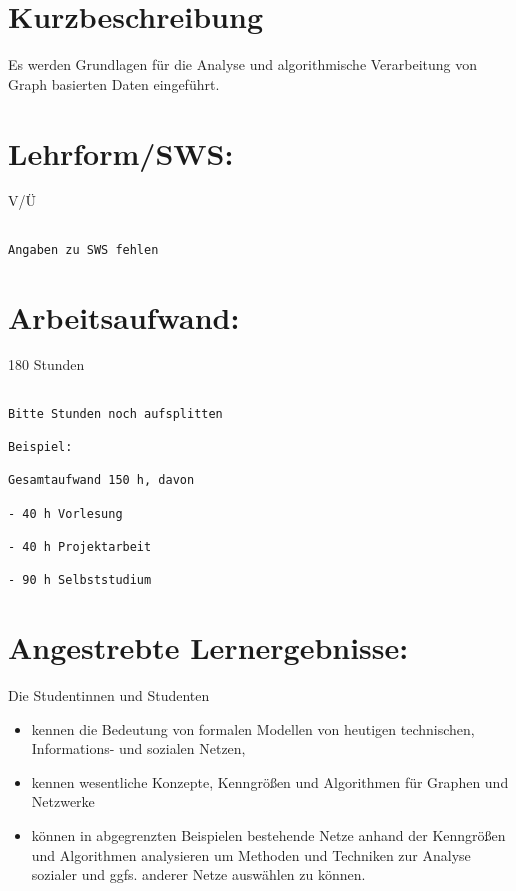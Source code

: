 \section*{Kurzbeschreibung}\label{kurzbeschreibung-5}

Es werden Grundlagen für die Analyse und algorithmische Verarbeitung von
Graph basierten Daten eingeführt.

\section*{Lehrform/SWS:}\label{lehrformsws-11}

V/Ü

\begin{verbatim}

Angaben zu SWS fehlen
\end{verbatim}

\section*{Arbeitsaufwand:}\label{arbeitsaufwand-17}

180 Stunden

\begin{verbatim}

Bitte Stunden noch aufsplitten

Beispiel:

Gesamtaufwand 150 h, davon 

- 40 h Vorlesung 

- 40 h Projektarbeit  

- 90 h Selbststudium 
\end{verbatim}

\section*{Angestrebte
Lernergebnisse:}\label{angestrebte-lernergebnisse-11}

Die Studentinnen und Studenten

\begin{itemize}
\tightlist
\item
  kennen die Bedeutung von formalen Modellen von heutigen technischen,
  Informations- und sozialen Netzen,
\item
  kennen wesentliche Konzepte, Kenngrößen und Algorithmen für Graphen
  und Netzwerke
\item
  können in abgegrenzten Beispielen bestehende Netze anhand der
  Kenngrößen und Algorithmen analysieren um Methoden und Techniken zur
  Analyse sozialer und ggfs. anderer Netze auswählen zu können.
\end{itemize}


